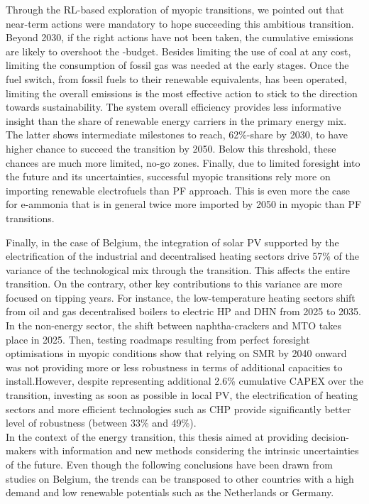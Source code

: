 Through the \gls{RL}-based exploration of myopic transitions, we pointed out that near-term actions were mandatory to hope succeeding this ambitious transition.  Beyond 2030, if the right actions have not been taken, the cumulative emissions are likely to overshoot the -budget. Besides limiting the use of coal at any cost, limiting the consumption of fossil gas was needed at the early stages. Once the fuel switch, from fossil fuels to their renewable equivalents, has been operated, limiting the overall emissions is the most effective action to stick to the direction towards sustainability. The system overall efficiency provides less informative insight than the share of renewable energy carriers in the primary energy mix. The latter shows intermediate milestones to reach, 62\%-share by 2030, to have higher chance to succeed the transition by 2050. Below this threshold, these chances are much more limited, \ie no-go zones. Finally, due to limited foresight into the future and its uncertainties, successful myopic transitions rely more on importing renewable electrofuels than PF approach. This is even more the case for e-ammonia that is in general twice more imported by 2050 in myopic than PF transitions.

Finally, in the case of Belgium, the integration of solar \gls{PV} supported by the electrification of the industrial and decentralised heating sectors drive 57\% of the variance of the technological mix through the transition. This affects the entire transition. On the contrary, other key contributions to this variance are more focused on tipping years. For instance, the low-temperature heating sectors shift from oil and gas decentralised boilers to electric \acrfull{HP} and \acrfull{DHN} from 2025 to 2035. In the non-energy sector, the shift between naphtha-crackers and \acrfull{MTO} takes place in 2025. Then, testing roadmaps resulting from perfect foresight optimisations in myopic conditions show that relying on \gls{SMR} by 2040 onward was not providing more or less robustness in terms of additional capacities to install.However, despite representing additional 2.6\% cumulative CAPEX over the transition, investing as soon as possible in local \gls{PV}, the electrification of heating sectors and more efficient technologies such as \acrfull{CHP} provide significantly better level of robustness (between 33\% and 49\%).\\


In the context of the energy transition, this thesis aimed at providing decision-makers with information and new methods considering the intrinsic uncertainties of the future. Even though the following conclusions have been drawn from studies on Belgium, the trends can be transposed to other countries with a high demand and low renewable potentials such as the Netherlands or Germany. 

